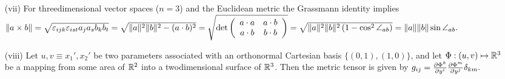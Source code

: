 \begin{itemize}
\item[(vii)]
For threedimensional vector spaces ($n=3$) and the Euclidean metric the Grassmann identity implies\\
$\| a\times b \| =
\sqrt{\varepsilon_{ijk}\varepsilon_{ist}a_j a_s b_k b_t}  =
\sqrt{\| a\|^2
\| b\|^2
-(a\cdot b)^2}=\sqrt{{\rm det}
\left(
\begin{array}{cc}
a\cdot a&a\cdot b\\
a\cdot b&b\cdot b
\end{array}\right)}=
\sqrt{\| a\|^2
\| b\|^2 \left (1- \cos^2 \angle_{ab} \right)}
 =
\| a\|
\| b\|
\sin \angle_{ab}.$
\item[(viii)]
Let $u,v\equiv x_1',x_2'$ be two parameters associated with an
orthonormal Cartesian basis $\{(0,1),(1,0)\}$, and let
$\Phi :(u,v)\mapsto {\Bbb R}^3$
be a mapping from some area of ${\Bbb R}^2$ into a twodimensional
surface of ${\Bbb R}^3$. Then the metric tensor is given by
$g_{ij}=
{\partial \Phi^k \over \partial  y ^i}
{\partial \Phi^m \over \partial  y^j} \delta_{km}.$

\end{itemize}






